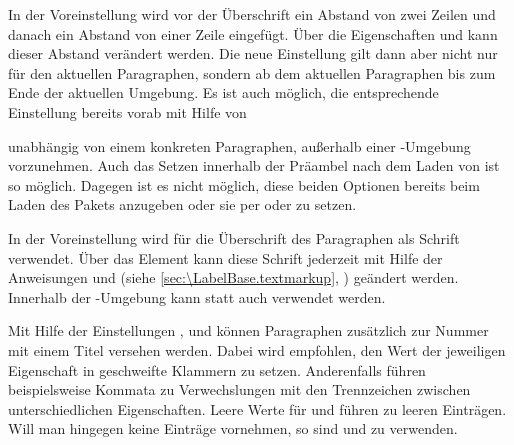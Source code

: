 In der Voreinstellung wird vor der Überschrift ein
Abstand von zwei Zeilen und danach ein Abstand von einer Zeile eingefügt. Über
die Eigenschaften  und  kann dieser Abstand verändert
werden. Die neue Einstellung gilt dann aber nicht nur für den aktuellen
Paragraphen, sondern ab dem aktuellen Paragraphen bis zum Ende der aktuellen
Umgebung. Es ist auch möglich, die entsprechende Einstellung bereits vorab mit
Hilfe von
\begin{lstcode}[escapeinside=><]
\end{lstcode}
unabhängig von einem konkreten Paragraphen, außerhalb einer
-Umgebung vorzunehmen. Auch das Setzen
innerhalb der Präambel nach dem Laden von  ist so
möglich. Dagegen ist es nicht möglich, diese beiden Optionen bereits beim
Laden des Pakets anzugeben oder sie per 
oder  zu setzen.

%
%
In der Voreinstellung wird für die Überschrift des
Paragraphen als Schrift 
verwendet. Über das Element
 kann
diese Schrift jederzeit mit Hilfe der Anweisungen
%
 und
 (siehe
\autoref{sec:\LabelBase.textmarkup}, )
geändert werden. Innerhalb der -Umgebung kann
statt  auch
 verwendet werden.%
%

Mit Hilfe der Einstellungen ,  und 
können Paragraphen zusätzlich zur Nummer mit einem Titel versehen
werden. Dabei wird empfohlen, den Wert der jeweiligen
Eigenschaft in geschweifte Klammern zu setzen. Anderenfalls führen
beispielsweise Kommata zu Verwechslungen mit den Trennzeichen zwischen
unterschiedlichen Eigenschaften. Leere Werte für  und
 führen zu leeren Einträgen. Will man hingegen keine Einträge
vornehmen, so sind  und  zu verwenden.

